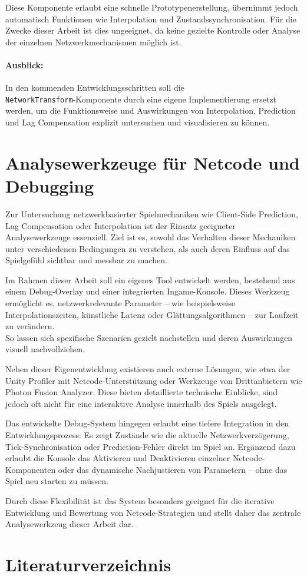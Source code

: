 \documentclass{article}
\begin{document}
Diese Komponente erlaubt eine schnelle Prototypenerstellung, übernimmt jedoch automatisch Funktionen wie Interpolation und Zustandssynchronisation. Für die Zwecke dieser Arbeit ist dies ungeeignet, da keine gezielte Kontrolle oder Analyse der einzelnen Netzwerkmechanismen möglich ist. 

\paragraph{Ausblick:}
In den kommenden Entwicklungsschritten soll die \\ \texttt{NetworkTransform}-Komponente durch eine eigene Implementierung ersetzt werden, um die Funktionsweise und Auswirkungen von Interpolation, Prediction und Lag Compensation explizit untersuchen und visualisieren zu können.

\newpage

\section{Analysewerkzeuge für Netcode und Debugging}


Zur Untersuchung netzwerkbasierter Spielmechaniken wie Client-Side Prediction, Lag Compensation oder Interpolation ist der Einsatz geeigneter Analysewerkzeuge essenziell. Ziel ist es, sowohl das Verhalten dieser Mechaniken unter verschiedenen Bedingungen zu verstehen, als auch deren Einfluss auf das Spielgefühl sichtbar und messbar zu machen.

Im Rahmen dieser Arbeit soll ein eigenes Tool entwickelt werden, bestehend aus einem Debug-Overlay und einer integrierten Ingame-Konsole. Dieses Werkzeug ermöglicht es, netzwerkrelevante Parameter -- wie beispielsweise Interpolationszeiten, künstliche Latenz oder Glättungsalgorithmen -- zur Laufzeit zu verändern. \\
So lassen sich spezifische Szenarien gezielt nachstellen und deren Auswirkungen visuell nachvollziehen.

Neben dieser Eigenentwicklung existieren auch externe Lösungen, wie etwa der Unity Profiler mit Netcode-Unterstützung oder Werkzeuge von Drittanbietern wie Photon Fusion Analyzer. Diese bieten detaillierte technische Einblicke, sind jedoch oft nicht für eine interaktive Analyse innerhalb des Spiels ausgelegt.

Das entwickelte Debug-System hingegen erlaubt eine tiefere Integration in den Entwicklungsprozess: Es zeigt Zustände wie die aktuelle Netzwerkverzögerung, Tick-Synchronisation oder Prediction-Fehler direkt im Spiel an. Ergänzend dazu erlaubt die Konsole das Aktivieren und Deaktivieren einzelner Netcode-Komponenten oder das dynamische Nachjustieren von Parametern -- ohne das Spiel neu starten zu müssen.

Durch diese Flexibilität ist das System besonders geeignet für die iterative Entwicklung und Bewertung von Netcode-Strategien und stellt daher das zentrale Analysewerkzeug dieser Arbeit dar.

\newpage
\section{Literaturverzeichnis}
\printbibliography
\end{document}
